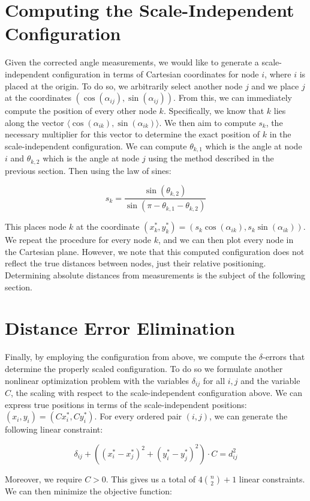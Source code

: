 \documentclass[12pt]{article}
\begin{document}
\section{Computing the Scale-Independent Configuration}
Given the corrected angle measurements, we would like to generate a scale-independent configuration in terms of Cartesian coordinates for node $i$, where $i$ is placed at the origin. To do so, we arbitrarily select another node $j$ and we place $j$ at the coordinates $(\cos(\alpha_{ij}), \sin(\alpha_{ij}))$. From this, we can immediately compute the position of every other node $k$. Specifically, we know that $k$ lies along the vector $\langle \cos(\alpha_{ik}), \sin(\alpha_{ik}) \rangle$. We then aim to compute $s_k$, the necessary multiplier for this vector to determine the exact position of $k$ in the scale-independent configuration. We can compute $\theta_{k,1}$ which is the angle at node $i$ and $\theta_{k,2}$ which is the angle at node $j$ using the method described in the previous section. Then using the law of sines:

$$s_k = \frac{\sin(\theta_{k,2})} {\sin(\pi-\theta_{k,1}-\theta_{k,2})}$$

This places node $k$ at the coordinate $(x_k^*, y_k^*) = (s_k\cos(\alpha_{ik}), s_k\sin(\alpha_{ik}))$. We repeat the procedure for every node $k$, and we can then plot every node in the Cartesian plane. However, we note that this computed configuration does not reflect the true distances between nodes, just their relative positioning. Determining absolute distances from measurements is the subject of the following section.

\section{Distance Error Elimination}
Finally, by employing the configuration from above, we compute the $\delta$-errors that determine the properly scaled configuration. To do so we formulate another nonlinear optimization problem with the variables $\delta_{ij}$ for all $i,j$ and the variable $C$, the scaling with respect to the scale-independent configuration above. We can express true positions in terms of the scale-independent positions: $(x_i, y_i) = (Cx_i^*, Cy_i^*)$. For every ordered pair $(i,j)$, we can generate the following linear constraint:

$$\delta_{ij} + ((x_i^* - x_j^*)^2+ (y_i^* - y_j^*)^2) \cdot C = d_{ij}^2$$

Moreover, we require $C > 0$. This gives us a total of $4{n \choose 2} + 1$ linear constraints. We can then minimize the objective function:
\end{document}
